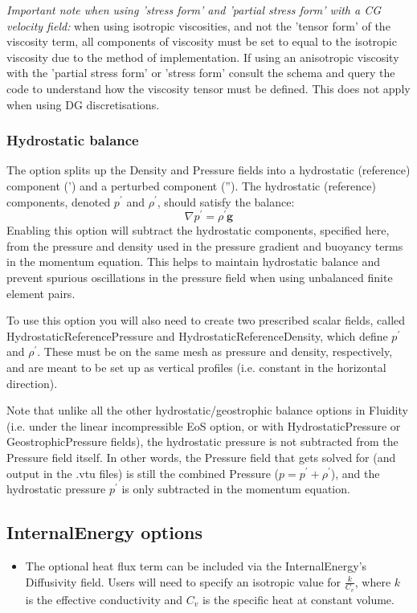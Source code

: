 \emph{Important note when using 'stress form' and 'partial stress form' with a CG velocity field:} when using isotropic viscosities, and not the 'tensor form' of the viscosity term, all components of viscosity must be set to equal to the isotropic viscosity due to the method of implementation. If using an anisotropic viscosity with the 'partial stress form' or 'stress form' consult the schema and query the code to understand how the viscosity tensor must be defined. This does not apply when using DG discretisations. 

\subsubsection{Hydrostatic balance}
The option  splits up the Density and Pressure fields into a hydrostatic (reference) component (') and a perturbed component (''). The hydrostatic (reference) components, denoted $p^{\prime}$ and $\rho^{\prime}$, should satisfy the balance:
\begin{equation}
  \nabla p^{\prime} = \rho^{\prime}\mathbf{g}
\end{equation}
Enabling this option will subtract the hydrostatic components, specified here, from the pressure and density used in the pressure gradient and buoyancy terms in the momentum equation. This helps to maintain hydrostatic balance and prevent spurious oscillations in the pressure field when using unbalanced finite element pairs.

To use this option you will also need to create two prescribed scalar fields, called HydrostaticReferencePressure and HydrostaticReferenceDensity, which define $p^{\prime}$ and $\rho^{\prime}$. These must be on the same mesh as pressure and density, respectively, and are meant to be set up as vertical profiles (i.e. constant in the horizontal direction). 

Note that unlike all the other hydrostatic/geostrophic balance options in Fluidity (i.e.  under the linear incompressible EoS option, or with HydrostaticPressure or GeostrophicPressure fields), the hydrostatic pressure is not subtracted from the Pressure field itself. In other words, the Pressure field that gets solved for (and output in the .vtu files) is still the combined Pressure ($p = p^{\prime} + \rho^{\prime}$), and the hydrostatic pressure $p^{\prime}$ is only subtracted in the momentum equation.

\subsection{InternalEnergy options}
\begin{itemize}
\item The optional heat flux term can be included via the InternalEnergy's Diffusivity field. Users will need to specify an isotropic value for $\frac{k}{C_v}$, where $k$ is the effective conductivity and $C_v$ is the specific heat at constant volume.
\end{itemize}

